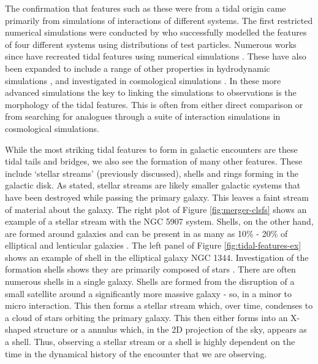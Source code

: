 The confirmation that features such as these were from a tidal origin came primarily from simulations of interactions of different systems. The first restricted numerical simulations were conducted by \citet{1972ApJ...178..623T} who successfully modelled the features of four different systems using distributions of test particles. Numerous works since have recreated tidal features using numerical simulations \citep{1993ApJ...410..586S, 2008AN....329.1046P, 2009AJ....137.3071B, 2016A&C....16...26W}. These have also been expanded to include a range of other properties in hydrodynamic simulations \citep{2013MNRAS.430.1901H, 2019MNRAS.485.1320M, 2021MNRAS.503.3113M, 2022MNRAS.509.2720S}, and investigated in cosmological simulations \citep{2015MNRAS.452.2845K, 2019MNRAS.490.2139R, 2020MNRAS.493.3716H, 2023RAA....23k5018D}. In these more advanced simulations the key to linking the simulations to observations is the morphology of the tidal features. This is often from either direct comparison or from searching for analogues through a suite of interaction simulations in cosmological simulations.

While the most striking tidal features to form in galactic encounters are these tidal tails and bridges, we also see the formation of many other features. These include `stellar streams' (previously discussed), shells and rings forming in the galactic disk. As stated, stellar streams are likely smaller galactic systems that have been destroyed while passing the primary galaxy. This leaves a faint stream of material about the galaxy. The right plot of Figure \ref{fig:merger-clsfs} shows an example of a stellar stream with the NGC 5907 system. Shells, on the other hand, are formed around galaxies and can be present in as many as 10\% - 20\% of elliptical and lenticular galaxies \citep{1983ApJ...274..534M, 2013ApJ...765...28A}. The left panel of Figure \ref{fig:tidal-features-ex} shows an example of shell in the elliptical galaxy NGC 1344. Investigation of the formation shells shows they are primarily composed of stars \citep{1984ApJ...279..596Q}. There are often numerous shells in a single galaxy. Shells are formed from the disruption of a small satellite around a significantly more massive galaxy - so, in a minor to micro interaction. This then forms a stellar stream which, over time, condenses to a cloud of stars orbiting the primary galaxy. This then either forms into an X-shaped structure or a annulus which, in the 2D projection of the sky, appears as a shell. Thus, observing a stellar stream or a shell is highly dependent on the time in the dynamical history of the encounter that we are observing.

